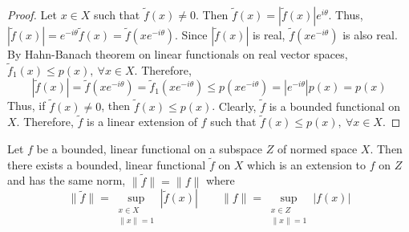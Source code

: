 \begin{proof}
	Let $x \in X$ such that $\tilde{f}(x) \ne 0$.
	Then $\tilde{f}(x) = |\tilde{f}(x)|e^{i\theta}$.
	Thus, $|\tilde{f}(x)| = e^{-i\theta}\tilde{f}(x) = \tilde{f}(xe^{-i\theta})$.
	Since $|\tilde{f}(x)|$ is real, $\tilde{f}(xe^{-i\theta})$ is also real.
	By Hahn-Banach theorem on linear functionals on real vector spaces, $\tilde{f}_1(x) \le p(x),\ \forall x \in X$.
	Therefore,
	\[ |\tilde{f}(x)| = \tilde{f}(xe^{-i\theta}) = \tilde{f}_1\left(xe^{-i\theta}\right) \le p\left(xe^{-i\theta}\right) = |e^{-i\theta}|p(x) = p(x) \]
	Thus, if $\tilde{f}(x) \ne 0$, then $\tilde{f}(x) \le p(x)$.
	{\color{red}
	Clearly, $\tilde{f}$ is a bounded functional on $X$.}
	Therefore, $\tilde{f}$ is a linear extension of $f$ such that $\tilde{f}(x) \le p(x),\ \forall x \in X$.
\end{proof}

\begin{theorem}
	Let $f$ be a bounded, linear functional on a subspace $Z$ of normed space $X$.
	Then there exists a bounded, linear functional $\tilde{f}$ on $X$ which is an extension to $f$ on $Z$ and has the same norm, $\|\tilde{f}\| = \|f\|$ where 
	\[ \|\tilde{f}\| = \sup_{\substack{x \in X\\ \|x\|=1}} |\tilde{f}(x)| \qquad \|f\| = \sup_{\substack{x \in Z\\\|x\| = 1}} |f(x)| \]
\end{theorem}
